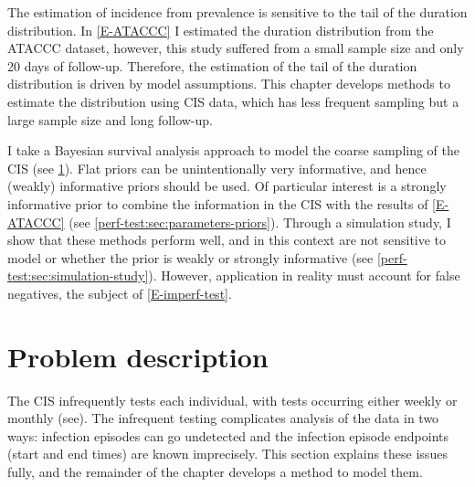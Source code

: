 \documentclass[thesis.tex]{subfiles}
\begin{document}
The estimation of incidence from prevalence is sensitive to the tail of the duration distribution.
In \cref{E-ATACCC} I estimated the duration distribution from the ATACCC dataset, however, this study suffered from a small sample size and only 20 days of follow-up.
Therefore, the estimation of the tail of the duration distribution is driven by model assumptions.
This chapter develops methods to estimate the distribution using CIS data, which has less frequent sampling but a large sample size and long follow-up.

I take a Bayesian survival analysis approach to model the coarse sampling of the CIS (see \cref{perf-test:sec:problem}).
Flat priors can be unintentionally very informative, and hence (weakly) informative priors should be used.
Of particular interest is a strongly informative prior to combine the information in the CIS with the results of \cref{E-ATACCC} (see \cref{perf-test:sec:parameters-priors}).
Through a simulation study, I show that these methods perform well, and in this context are not sensitive to model or whether the prior is weakly or strongly informative (see \cref{perf-test:sec:simulation-study}).
However, application in reality must account for false negatives, the subject of \cref{E-imperf-test}.

\section{Problem description} \label{perf-test:sec:problem}

The CIS infrequently tests each individual, with tests occurring either weekly or monthly (see).
The infrequent testing complicates analysis of the data in two ways: infection episodes can go undetected and the infection episode endpoints (start and end times) are known imprecisely.
This section explains these issues fully, and the remainder of the chapter develops a method to model them.
\end{document}
